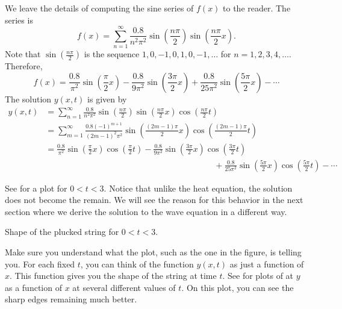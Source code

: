 \begin{example}
We leave the details of computing the sine series of $f(x)$
to the reader.  The series is
\begin{equation*}
f(x) = \sum_{n=1}^\infty
\frac{0.8}{n^2 \pi^2}
\sin \left( \frac{n \pi}{2} \right)
\sin \left( \frac{n \pi}{2} x \right) .
\end{equation*}
Note that 
$\sin \left( \frac{n \pi}{2} \right)$
is the sequence $1, 0, -1, 0, 1, 0, -1, \ldots$
for $n = 1,2,3,4,\ldots$.  Therefore,
\begin{equation*}
f(x) = 
\frac{0.8}{\pi^2}
\sin \left( \frac{\pi}{2} x \right)
-
\frac{0.8}{9 \pi^2}
\sin \left( \frac{3 \pi}{2} x \right)
+
\frac{0.8}{25 \pi^2}
\sin \left( \frac{5 \pi}{2} x \right)
- \cdots
\end{equation*}
The solution $y(x,t)$ is given by
\begin{equation*}
\begin{split}
y(x,t) & = 
\sum_{n=1}^\infty
\frac{0.8}{n^2 \pi^2}
\sin \left( \frac{n \pi}{2} \right)
\sin \left( \frac{n \pi}{2} x \right)
\cos \left( \frac{n \pi}{2} t \right)
\\
& = 
\sum_{m=1}^\infty
\frac{0.8 {(-1)}^{m+1}}{{(2m-1)}^2 \pi^2}
\sin \left( \frac{(2m-1) \pi}{2} x \right)
\cos \left( \frac{(2m-1) \pi}{2} t \right)
\\
& =
\frac{0.8}{\pi^2} 
\sin \left( \frac{\pi}{2}  x \right)
\cos \left( \frac{\pi}{2}  t \right)
-
\frac{0.8}{9 \pi^2} 
\sin \left( \frac{3 \pi}{2}  x \right)
\cos \left( \frac{3 \pi}{2}  t \right)
\\
& \hspace{20em}
+
\frac{0.8}{25 \pi^2}
\sin \left( \frac{5 \pi}{2}  x \right)
\cos \left( \frac{5 \pi}{2}  t \right) 
- \cdots
\end{split}
\end{equation*}

See 
 for a plot
for $0 < t < 3$.  Notice
that unlike the heat equation, the solution does not become
the  remain.  We will see the reason for this behavior in the
next section where we derive the solution to the wave equation in a different
way.

\begin{myfig}
\capstart
{}
\caption{Shape of the plucked string for $0 < t < 3$.\label{wave:pluckedexfig}}
\end{myfig}

Make sure you understand what the plot, such as the one in the figure, is
telling you.  For each fixed $t$, you can think of the function 
$y(x,t)$ as just a function of $x$.  This function gives you the shape of the
string at time $t$.  See  for plots of
at $y$ as a function of $x$ at several different values of $t$.
On this plot, you can see the sharp edges remaining much better.


\end{example}
